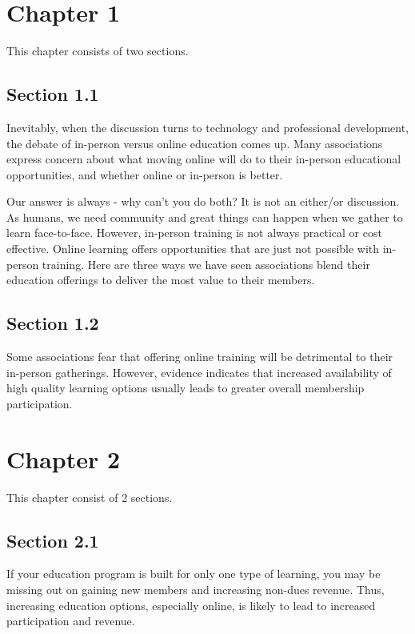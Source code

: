 \chapter{Chapter 1}
\label{chapter:1}

This chapter consists of two sections.

\section{Section 1.1}
\label{section:1-1}

Inevitably, when the discussion turns to technology and professional development, the debate of in-person versus online education comes up. Many associations express concern about what moving online will do to their in-person educational opportunities, and whether online or in-person is better. 

Our answer is always - why can't you do both? It is not an either/or discussion. As humans, we need community and great things can happen when we gather to learn face-to-face. However, in-person training is not always practical or cost effective. Online learning offers opportunities that are just not possible with in-person training. Here are three ways we have seen associations blend their education offerings to deliver the most value to their members.

\section{Section 1.2}
\label{section:1-2}

Some associations fear that offering online training will be detrimental to their in-person gatherings. However, evidence indicates that increased availability of high quality learning options usually leads to greater overall membership participation. 

\chapter{Chapter 2}
\label{chapter:2}

This chapter consist of 2 sections.

\section{Section 2.1}
\label{section:2-1}

If your education program is built for only one type of learning, you may be missing out on gaining new members and increasing non-dues revenue. Thus, increasing education options, especially online, is likely to lead to increased participation and revenue.

